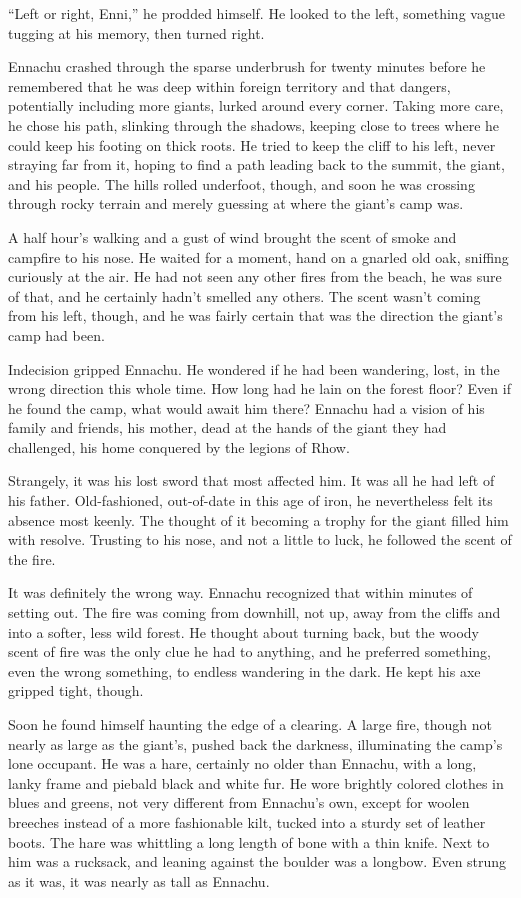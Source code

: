 ``Left or right, Enni,'' he prodded himself. He looked to the left, something vague tugging at his memory, then turned right.

Ennachu crashed through the sparse underbrush for twenty minutes before he remembered that he was deep within foreign territory and that dangers, potentially including more giants, lurked around every corner. Taking more care, he chose his path, slinking through the shadows, keeping close to trees where he could keep his footing on thick roots. He tried to keep the cliff to his left, never straying far from it, hoping to find a path leading back to the summit, the giant, and his people. The hills rolled underfoot, though, and soon he was crossing through rocky terrain and merely guessing at where the giant's camp was.

A half hour's walking and a gust of wind brought the scent of smoke and campfire to his nose. He waited for a moment, hand on a gnarled old oak, sniffing curiously at the air. He had not seen any other fires from the beach, he was sure of that, and he certainly hadn't smelled any others. The scent wasn't coming from his left, though, and he was fairly certain that was the direction the giant's camp had been.

Indecision gripped Ennachu. He wondered if he had been wandering, lost, in the wrong direction this whole time. How long had he lain on the forest floor? Even if he found the camp, what would await him there? Ennachu had a vision of his family and friends, his mother, dead at the hands of the giant they had challenged, his home conquered by the legions of Rhow.

Strangely, it was his lost sword that most affected him. It was all he had left of his father. Old-fashioned, out-of-date in this age of iron, he nevertheless felt its absence most keenly. The thought of it becoming a trophy for the giant filled him with resolve. Trusting to his nose, and not a little to luck, he followed the scent of the fire.

It was definitely the wrong way. Ennachu recognized that within minutes of setting out. The fire was coming from downhill, not up, away from the cliffs and into a softer, less wild forest. He thought about turning back, but the woody scent of fire was the only clue he had to anything, and he preferred something, even the wrong something, to endless wandering in the dark. He kept his axe gripped tight, though.

Soon he found himself haunting the edge of a clearing. A large fire, though not nearly as large as the giant's, pushed back the darkness, illuminating the camp's lone occupant. He was a hare, certainly no older than Ennachu, with a long, lanky frame and piebald black and white fur. He wore brightly colored clothes in blues and greens, not very different from Ennachu's own, except for woolen breeches instead of a more fashionable kilt, tucked into a sturdy set of leather boots. The hare was whittling a long length of bone with a thin knife. Next to him was a rucksack, and leaning against the boulder was a longbow. Even strung as it was, it was nearly as tall as Ennachu.

